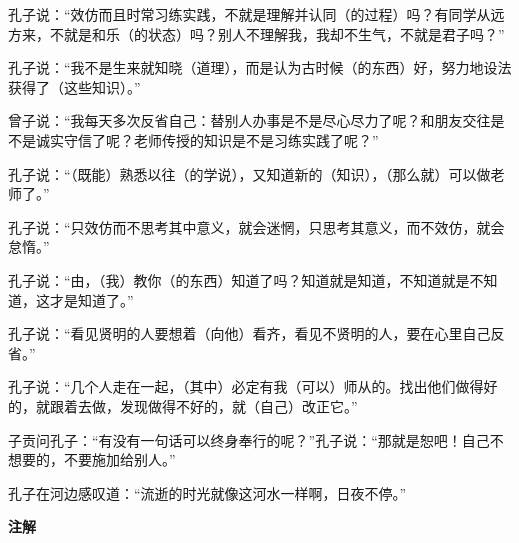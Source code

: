 \documentclass[12pt,UTF-8,openany,a4]{ctexbook}
\begin{document}
\begin{large}
    \yiwen 
    孔子说：“效仿而且时常习练实践，不就是理解并认同（的过程）吗？有同学从远方来，不就是和乐（的状态）吗？别人不理解我，我却不生气，不就是君子吗？”
    
    孔子说：“我不是生来就知晓（道理），而是认为古时候（的东西）好，努力地设法获得了（这些知识）。”
    
    曾子说：“我每天多次反省自己：替别人办事是不是尽心尽力了呢？和朋友交往是不是诚实守信了呢？老师传授的知识是不是习练实践了呢？”
    
    孔子说：“（既能）熟悉以往（的学说），又知道新的（知识），（那么就）可以做老师了。”
    
    孔子说：“只效仿而不思考其中意义，就会迷惘，只思考其意义，而不效仿，就会怠惰。”
    
    孔子说：“由，（我）教你（的东西）知道了吗？知道就是知道，不知道就是不知道，这才是知道了。”
    
    孔子说：“看见贤明的人要想着（向他）看齐，看见不贤明的人，要在心里自己反省。”
    
    孔子说：“几个人走在一起，（其中）必定有我（可以）师从的。找出他们做得好的，就跟着去做，发现做得不好的，就（自己）改正它。”
    
    子贡问孔子：“有没有一句话可以终身奉行的呢？”孔子说：“那就是恕吧！自己不想要的，不要施加给别人。”
    
    孔子在河边感叹道：“流逝的时光就像这河水一样啊，日夜不停。”
    
\end{large}


\newpage

\begin{Large}
    \noindent\textbf{注解}
\end{Large}


\vspace{-1em}
\end{document}
